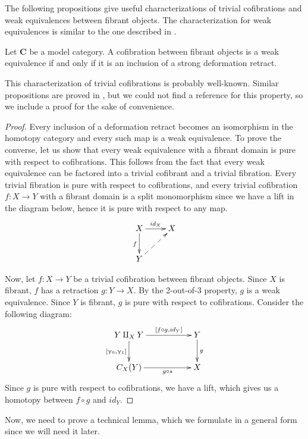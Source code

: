 \documentclass{tac}
\theoremstyle{definition}
\newcommand{\cat}[1]{\mathbf{#1}}
\newcommand{\C}{\cat{C}}
\newcommand{\cyli}{\upgamma}
\begin{document}
The following propositions give useful characterizations of trivial
cofibrations and weak equivalences between fibrant objects.
The characterization for weak equivalences is similar to the one described in \cite{vogt-we}.

\begin{prop}
Let $\C$ be a model category.
A cofibration between fibrant objects is a weak equivalence if and only if it is an inclusion of a strong deformation retract.
\end{prop}

This characterization of trivial cofibrations is probably well-known.
Similar propositions are proved in \cite{hirschhorn}, but we could not find a reference for this property, so we include a proof for the sake of convenience.

\begin{proof}
Every inclusion of a deformation retract becomes an isomorphism in the homotopy category and every such map is a weak equivalence.
To prove the converse, let us show that every weak equivalence with a fibrant domain is pure with respect to cofibrations.
This follows from the fact that every weak equivalence can be factored into a trivial cofibrant and a trivial fibration.
Every trivial fibration is pure with respect to cofibrations, and every trivial cofibration $f : X \to Y$ with a fibrant domain is a split monomorphism since we have a lift in the diagram below,
hence it is pure with respect to any map.
\[ \xymatrix{ X \ar[r]^{id_X} \ar[d]_f & X \\
              Y \ar@{-->}[ur]
            } \]

Now, let $f : X \to Y$ be a trivial cofibration between fibrant objects.
Since $X$ is fibrant, $f$ has a retraction $g : Y \to X$.
By the 2-out-of-3 property, $g$ is a weak equivalence.
Since $Y$ is fibrant, $g$ is pure with respect to cofibrations.
Consider the following diagram:
\[ \xymatrix{ Y \amalg_X Y \ar[rr]^-{[f \circ g, id_Y]} \ar[d]_{[\cyli_0,\cyli_1]} & & Y \ar[d]^g \\
              C_X(Y) \ar[rr]_-{g \circ s} & & X
            } \]
Since $g$ is pure with respect to cofibrations, we have a lift, which gives us a homotopy between $f \circ g$ and $id_Y$.
\end{proof}

Now, we need to prove a technical lemma, which we formulate in a general form since we will need it later.
\end{document}
